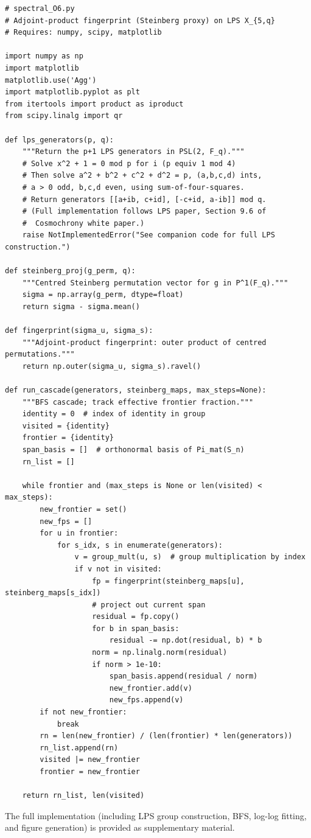 \documentclass[11pt]{article}
\theoremstyle{definition}
\theoremstyle{remark}
\begin{document}
  \begin{verbatim}
# spectral_O6.py
# Adjoint-product fingerprint (Steinberg proxy) on LPS X_{5,q}
# Requires: numpy, scipy, matplotlib

import numpy as np
import matplotlib
matplotlib.use('Agg')
import matplotlib.pyplot as plt
from itertools import product as iproduct
from scipy.linalg import qr

def lps_generators(p, q):
    """Return the p+1 LPS generators in PSL(2, F_q)."""
    # Solve x^2 + 1 = 0 mod p for i (p equiv 1 mod 4)
    # Then solve a^2 + b^2 + c^2 + d^2 = p, (a,b,c,d) ints,
    # a > 0 odd, b,c,d even, using sum-of-four-squares.
    # Return generators [[a+ib, c+id], [-c+id, a-ib]] mod q.
    # (Full implementation follows LPS paper, Section 9.6 of
    #  Cosmochrony white paper.)
    raise NotImplementedError("See companion code for full LPS construction.")

def steinberg_proj(g_perm, q):
    """Centred Steinberg permutation vector for g in P^1(F_q)."""
    sigma = np.array(g_perm, dtype=float)
    return sigma - sigma.mean()

def fingerprint(sigma_u, sigma_s):
    """Adjoint-product fingerprint: outer product of centred permutations."""
    return np.outer(sigma_u, sigma_s).ravel()

def run_cascade(generators, steinberg_maps, max_steps=None):
    """BFS cascade; track effective frontier fraction."""
    identity = 0  # index of identity in group
    visited = {identity}
    frontier = {identity}
    span_basis = []  # orthonormal basis of Pi_mat(S_n)
    rn_list = []

    while frontier and (max_steps is None or len(visited) < max_steps):
        new_frontier = set()
        new_fps = []
        for u in frontier:
            for s_idx, s in enumerate(generators):
                v = group_mult(u, s)  # group multiplication by index
                if v not in visited:
                    fp = fingerprint(steinberg_maps[u], steinberg_maps[s_idx])
                    # project out current span
                    residual = fp.copy()
                    for b in span_basis:
                        residual -= np.dot(residual, b) * b
                    norm = np.linalg.norm(residual)
                    if norm > 1e-10:
                        span_basis.append(residual / norm)
                        new_frontier.add(v)
                        new_fps.append(v)
        if not new_frontier:
            break
        rn = len(new_frontier) / (len(frontier) * len(generators))
        rn_list.append(rn)
        visited |= new_frontier
        frontier = new_frontier

    return rn_list, len(visited)
  \end{verbatim}

  The full implementation (including LPS group construction, BFS, log-log fitting,
  and figure generation) is provided as supplementary material.

  \clearpage
  
      
\end{document}
